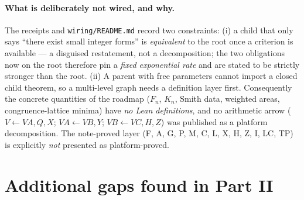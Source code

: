 \documentclass[11pt]{article}
\begin{document}
\paragraph{What is deliberately not wired, and why.} The receipts and
\texttt{wiring/README.md} record two constraints: (i) a child that only says ``there exist small
integer forms'' is \emph{equivalent} to the root once a criterion is available --- a disguised
restatement, not a decomposition; the two obligations now on the root therefore pin a \emph{fixed
exponential rate} and are stated to be strictly stronger than the root. (ii) A parent with free
parameters cannot import a closed child theorem, so a multi-level graph needs a definition layer
first. Consequently the concrete quantities of the roadmap ($F_n$, $K_n$, Smith data, weighted
areas, congruence-lattice minima) have \emph{no Lean definitions}, and no arithmetic arrow
($V\leftarrow VA,Q,X$; $VA\leftarrow VB,Y$; $VB\leftarrow VC,H,Z$) was published as a platform
decomposition. The note-proved layer (F, A, G, P, M, C, L, X, H, Z, I, LC, TP) is explicitly
\emph{not} presented as platform-proved.

\section{Additional gaps found in Part II}
\label{sec:gaps2}
\end{document}
